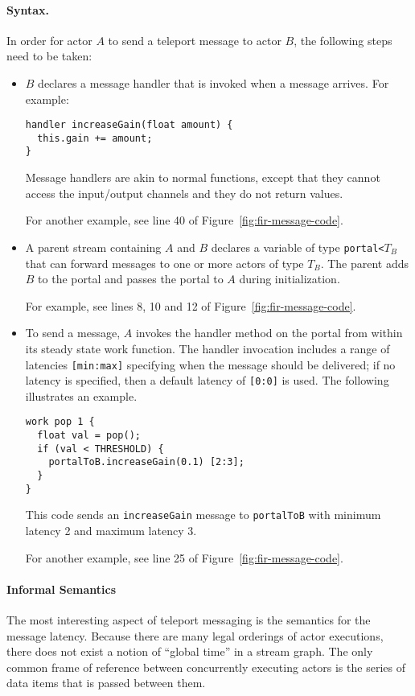 \paragraph*{Syntax.}  In order for actor $A$ to send a teleport message to
actor $B$, the following steps need to be taken:
\begin{itemize}

\item $B$ declares a message handler that is invoked when a
message arrives.  For example: {\small
\vspace{-5pt}
\begin{verbatim}
handler increaseGain(float amount) {
  this.gain += amount;
}
\end{verbatim}
\vspace{-5pt}}
Message handlers are akin to normal functions, except that they
cannot access the input/output channels and they do not return values.

For another example, see line 40 of Figure~\ref{fig:fir-message-code}.

\item A parent stream containing $A$ and $B$ declares a variable of
type {\tt portal<}$T_B$\hspace{-1pt}{\tt >} that can forward messages
to one or more actors of type $T_B$.  The parent adds $B$ to the
portal and passes the portal to $A$ during initialization.

For example, see lines 8, 10 and 12 of Figure~\ref{fig:fir-message-code}.

\item To send a message, $A$ invokes the handler method on the portal
from within its steady state work function. The handler invocation
includes a range of latencies {\tt [min:max]} specifying when the
message should be delivered; if no latency is specified, then a
default latency of {\tt [0:0]} is used.  The following illustrates an
example.{\small
\vspace{-5pt}
\begin{verbatim}
work pop 1 {
  float val = pop();
  if (val < THRESHOLD) {
    portalToB.increaseGain(0.1) [2:3];
  }
}
\end{verbatim}\vspace{-5pt}}
This code sends an {\tt increaseGain} message to {\tt portalToB} with
minimum latency 2 and maximum latency 3.

For another example, see line 25 of Figure~\ref{fig:fir-message-code}.
\end{itemize}
\paragraph*{Informal Semantics} The most interesting aspect of teleport
messaging is the semantics for the message latency.  Because there
are many legal orderings of actor executions, there does not exist a
notion of ``global time'' in a stream graph.  The only common frame of
reference between concurrently executing actors is the series of data
items that is passed between them.


